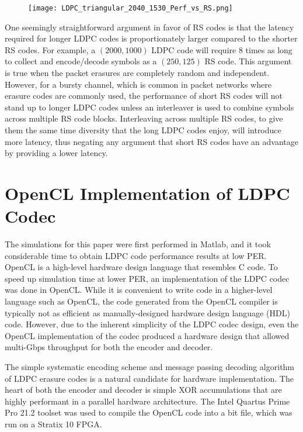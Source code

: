 \documentclass[conference]{IEEEtran}
\begin{document}
\begin{figure}[htbp]
	\centerline{\texttt{[image: LDPC\_triangular\_2040\_1530\_Perf\_vs\_RS.png]}}
	\caption{}
	\label{fig:LDPC_triangular_2040_1530_Perf_vs_RS}
\end{figure}

One seemingly straightforward argument in favor of RS codes is that the latency required for longer LDPC codes is proportionately larger compared to the shorter RS codes.  For example, a $(2000, 1000)$ LDPC code will require 8 times as long to collect and encode/decode symbols as a $(250, 125)$ RS code.  This argument is true when the packet erasures are completely random and independent.  However, for a bursty channel, which is common in packet networks where erasure codes are commonly used, the performance of short RS codes will not stand up to longer LDPC codes unless an interleaver is used to combine symbols across multiple RS code blocks.  Interleaving across multiple RS codes, to give them the same time diversity that the long LDPC codes enjoy, will introduce more latency, thus negating any argument that short RS codes have an advantage by providing a lower latency.



\section{OpenCL Implementation of LDPC Codec}\label{sec:Implementation}

The simulations for this paper were first performed in Matlab, and it took considerable time to obtain LDPC code performance results at low PER.  OpenCL is a high-level hardware design language that resembles C code. To speed up simulation time at lower PER, an implementation of the LDPC codec was done in OpenCL.  While it is convenient to write code in a higher-level language such as OpenCL, the code generated from the OpenCL compiler is typically not as efficient as manually-designed hardware design language (HDL) code.  However, due to the inherent simplicity of the LDPC codec design, even the OpenCL implementation of the codec produced a hardware design that allowed multi-Gbps throughput for both the encoder and decoder.

The simple systematic encoding scheme and message passing decoding algorithm of LDPC erasure codes is a natural candidate for hardware implementation.  The heart of both the encoder and decoder is simple XOR accumulations that are highly performant in a parallel hardware architecture. The Intel Quartus Prime Pro 21.2 toolset was used to compile the OpenCL code into a bit file, which was run on a Stratix 10 FPGA.
\end{document}
